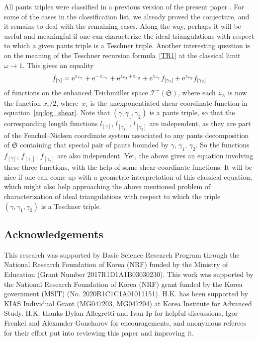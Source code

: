 \documentclass[10pt,a4paper]{amsart}
\numberwithin{equation}{section}
\theoremstyle{definition}
\begin{document}
All pants triples were classified in a previous version of the present paper \cite{ver3}. For some of the cases in the classification list, we already proved the conjecture, and it remains to deal with the remaining cases. Along the way, perhaps it will be useful and meaningful if one can characterize the ideal triangulations with respect to which a given pants triple is a Teschner triple.
Another interesting question is on the meaning of the Teschner recursion formula~\ref{TR1} at the classical limit $\omega \to 1$. This gives an equality
\[
f_{[\gamma]} = {\rm e}^{z_{v_\gamma}} + {\rm e}^{-z_{v_\gamma}} + {\rm e}^{z_{v_1} + z_{v_2}} + {\rm e}^{z_{v_1}} f_{[\gamma_1]} + {\rm e}^{z_{v_2}} f_{[\gamma_2]}
\]
of functions on the enhanced Teichm\"uller space $\mathscr{T}^+(\mathfrak{S})$, where each $z_{v_i}$ is now the function $x_i/2$, where~$x_i$ is the unexponentiated shear coordinate function in equation~\eqref{eq:log_shear}. Note that $(\gamma,\gamma_1,\gamma_2)$ is a pants triple, so that the corresponding length functions $l_{[\gamma]}$, $l_{[\gamma_1]}$, $l_{[\gamma_2]}$ are independent, as they are part of the Fenchel--Nielsen coordinate system associated to any pants decomposition of $\mathfrak{S}$ containing that special pair of pants bounded by $\gamma$, $\gamma_1$, $\gamma_2$. So the functions $f_{[\gamma]}$, $f_{[\gamma_1]}$, $f_{[\gamma_2]}$ are also independent. Yet, the above gives an equation involving these three functions, with the help of some shear coordinate functions. It will be nice if one can come up with a geometric interpretation of this classical equation, which might also help approaching the above mentioned problem of characterization of ideal triangulations with respect to which the triple $(\gamma,\gamma_1,\gamma_2)$ is a Teschner triple.
\subsection*{Acknowledgements}
This research was supported by Basic Science Research Program through the National Research Foundation of Korea (NRF) funded by the Ministry of Education (Grant Number 2017R1D1A1\-B03030230). This work was supported by the National Research Foundation of Korea (NRF) grant funded by the Korea government (MSIT) (No. 2020R1C1C1A01011151). H.K. has been supported by KIAS Individual Grant (MG047203, MG047204) at Korea Institute for Advanced Study. H.K. thanks Dylan Allegretti and Ivan Ip for helpful discussions, Igor Frenkel and Alexander Goncharov for encouragements, and anonymous referees for their effort put into reviewing this paper and improving it.
%
\end{document}
